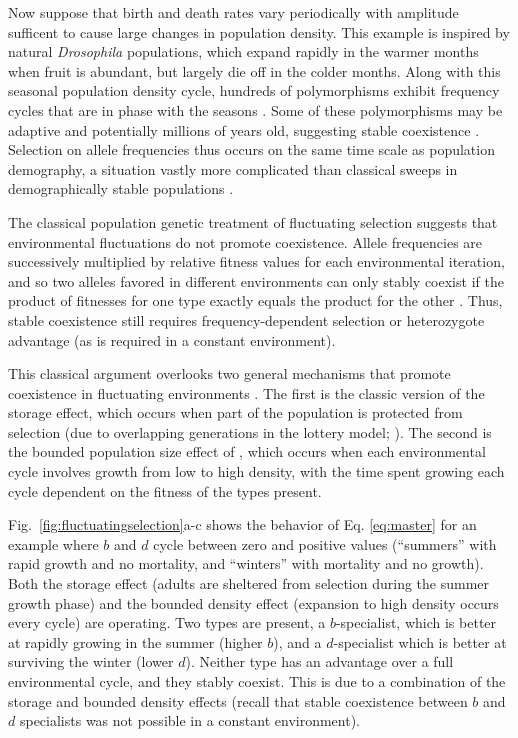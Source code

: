 \documentclass[11pt]{article}
\begin{document}
Now suppose that birth and death rates vary periodically with amplitude sufficent to cause large changes in population density. This example is inspired by natural \textit{Drosophila} populations, which expand rapidly in the warmer months when fruit is abundant, but largely die off in the colder months. Along with this seasonal population density cycle, hundreds of polymorphisms exhibit frequency cycles that are in phase with the seasons \citep{bergland_14}. Some of these polymorphisms may be adaptive and potentially millions of years old, suggesting stable coexistence \citep{bergland_14,messer_2016}. Selection on allele frequencies thus occurs on the same time scale as population demography, a situation vastly more complicated than classical sweeps in demographically stable populations \citep{messer_2016}.

The classical population genetic treatment of fluctuating selection suggests that environmental fluctuations do not promote coexistence. Allele frequencies are successively multiplied by relative fitness values for each environmental iteration, and so two alleles favored in different environments can only stably coexist if the product of fitnesses for one type exactly equals the product for the other \citep{dempster_1955}. Thus, stable coexistence still requires frequency-dependent selection or heterozygote advantage (as is required in a constant environment). 

This classical argument overlooks two general mechanisms that promote coexistence in fluctuating environments \citep{messer_2016}. The first is the classic version of the storage effect, which occurs when part of the population is protected from selection (due to overlapping generations in the lottery model; \citealt{chesson_1981}). The second is the bounded population size effect of \cite{yi_2013}, which occurs when each environmental cycle involves growth from low to high density, with the time spent growing each cycle dependent on the fitness of the types present. 

Fig.~\ref{fig:fluctuatingselection}a-c shows the behavior of Eq. \eqref{eq:master} for an example where $b$ and $d$ cycle between zero and positive values (``summers'' with rapid growth and no mortality, and ``winters'' with mortality and no growth). Both the storage effect (adults are sheltered from selection during the summer growth phase) and the bounded density effect (expansion to high density occurs every cycle) are operating. Two types are present, a $b$-specialist, which is better at rapidly growing in the summer (higher $b$), and a $d$-specialist which is better at surviving the winter (lower $d$). Neither type has an advantage over a full environmental cycle, and they stably coexist. This is due to a combination of the storage and bounded density effects (recall that stable coexistence between $b$ and $d$ specialists was not possible in a constant environment). 
\end{document}
